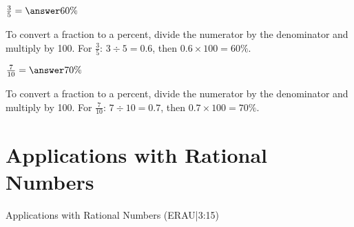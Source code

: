 \documentclass{ximera}
\begin{document}
\begin{problem}
$\frac{3}{5} = \answer{60\%}$

\begin{feedback}
To convert a fraction to a percent, divide the numerator by the denominator and multiply by 100. For $\frac{3}{5}$: $3 \div 5 = 0.6$, then $0.6 \times 100 = 60\%$.
\end{feedback}

\end{problem}

\begin{problem}
$\frac{7}{10} = \answer{70\%}$

\begin{feedback}
To convert a fraction to a percent, divide the numerator by the denominator and multiply by 100. For $\frac{7}{10}$: $7 \div 10 = 0.7$, then $0.7 \times 100 = 70\%$.
\end{feedback}

\end{problem}


\section*{Applications with Rational Numbers} 

Applications with Rational Numbers (ERAU|3:15)

\end{document}
